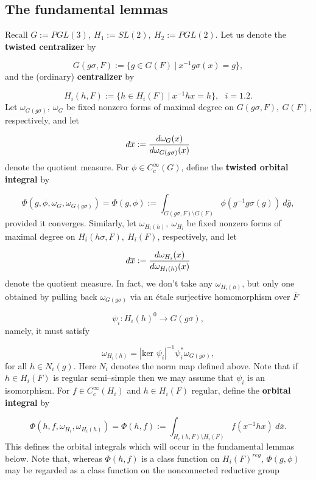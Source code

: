 \documentclass[12pt,letterpaper]{article}
\def\ovg{\overline{g}}
\def\ovx{\overline{x}}
\begin{document}
\subsection{The fundamental lemmas}
\label{sec:1.4}

Recall $G := PGL(3),\ H_1 := SL(2),\ H_2 := PGL(2)$. Let us denote the 
{\bf twisted centralizer} by

\begin{equation}
\label{eqn:1.15}
G(g\sigma ,F) := \{g \in G(F)\ |\ x^{-1}g\sigma (x) = g\},
\end{equation}
and the (ordinary) {\bf centralizer} by

\begin{equation}
\label{eqn:1.16}
H_i(h,F) := \{h \in H_i(F) \ |\ x^{-1}hx = h\},\ \ \ i=1.2.
\end{equation}
Let $\omega_{G(g\sigma )},\ \omega_G$ be fixed nonzero forms of maximal
degree on $G(g\sigma ,F),\ G(F)$, respectively, and let

\[
d\ovx := {d\omega_G(x)\over{d\omega_{G(g\sigma )}(x)}}
\]
denote the quotient measure. For $\phi \in C^\infty_c(G)$, define the 
{\bf twisted orbital integral} by

\begin{equation}
\label{eqn:1.17}
\Phi (g,\phi ,\omega_G,\omega_{G(g\sigma )}) = \Phi (g,\phi )
:= \int_{G(g\sigma ,F)\setminus G(F)}
\phi (g^{-1}g\sigma (g))\ d\ovg,
\end{equation}
provided it converges.
Similarly, let $\omega_{H_i(h)},\ \omega_{H_i}$ be fixed nonzero 
forms of maximal
degree on $H_i(h\sigma ,F),\ H_i(F)$, respectively, and let

\[
d\ovx := {d\omega_{H_i}(x)\over{d\omega_{H_i(h)}(x)}}
\]
denote the quotient measure. In fact, we don't take any $\omega_{H_i(h)}$,
but only one obtained by pulling back $\omega_{G(g\sigma)}$ via an \'etale
surjective homomorphism over $\overline{F}$

\[
\psi_i : H_i(h)^0 \rightarrow G(g\sigma ),
\]
namely, it must satisfy

\[
\omega_{H_i(h)}=|\text{ker }\psi_i|^{-1}\psi^*_i\omega_{G(g\sigma )},
\]
for all $h \in N_i(g)$. Here $N_i$ denotes the norm map defined above. 
Note that if $h \in H_i(F)$ is regular semi--simple then we may assume that
$\psi_i$ is an isomorphism. For $f \in C^\infty_c(H_i)$ and $h \in H_i(F)$
regular, define the {\bf orbital integral} by

\begin{equation}
\label{eqn:1.18}
\Phi (h,f,\omega_{H_i},\omega_{H_i(h)}) = 
\Phi (h,f):= \int_{H_i(h,F)\setminus H_i(F)}
f(x^{-1}hx)\ d\ovx .
\end{equation} 
This defines the orbital integrals which will
occur in the fundamental lemmas below. Note that, whereas 
$\Phi (h,f)$ is a class function on $H_i(F)^{reg}$, $\Phi (g,\phi )$
may be regarded as a class function on the nonconnected reductive group
\end{document}

